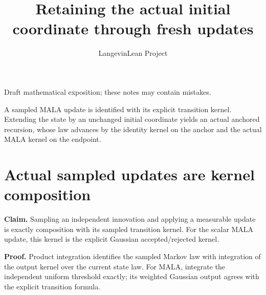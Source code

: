 \documentclass[11pt,a4paper]{article}
\title{\texorpdfstring{Retaining the actual initial coordinate through fresh updates}{Retaining the actual initial coordinate through fresh updates}}
\author{LangevinLean Project}
\date{}
\begin{document}
\maketitle
Draft mathematical exposition; these notes may contain mistakes.


A sampled MALA update is identified with its explicit transition kernel. Extending the state by an unchanged initial coordinate yields an actual anchored recursion, whose law advances by the identity kernel on the anchor and the actual MALA kernel on the endpoint.


\section{\texorpdfstring{Actual sampled updates are kernel composition}{Actual sampled updates are kernel composition}}


\textbf{Claim.} Sampling an independent innovation and applying a measurable update is exactly composition with its sampled transition kernel. For the scalar MALA update, this kernel is the explicit Gaussian accepted/\allowbreak{}rejected kernel.



\textbf{Proof.} Product integration identifies the sampled Markov law with integration of the output kernel over the current state law. For MALA, integrate the independent uniform threshold exactly; its weighted Gaussian output agrees with the explicit transition formula.
\end{document}
